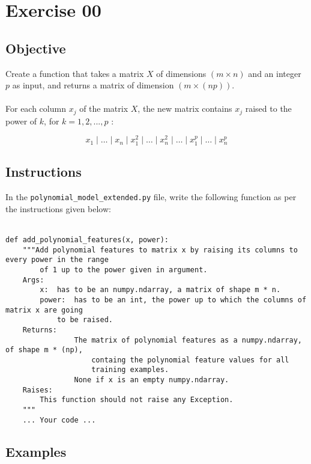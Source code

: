 \chapter{Exercise 00}
%
{}
\makeheaderfilesforbidden

\section*{Objective}
Create a function that takes a matrix $X$ of dimensions $(m \times n)$ and an integer $p$ 
as input, and returns a matrix of dimension $(m \times (np))$.\\
\\
For each column $x_j$ of the matrix $X$, the new matrix contains
$x_j$ raised to the power of $k$, for $k = 1, 2, ..., p$ :

$$
x_1  \mid  \ldots  \mid  x_n  \mid  x_1^2  \mid  \ldots  \mid  x_n^2  \mid  \ldots  \mid  x_1^p  \mid  \ldots  \mid  x_n^p
$$
\newpage
\section*{Instructions}
In the \texttt{polynomial\_model\_extended.py} file, write the following function 
as per the instructions given below:\\
\\
\begin{verbatim}
def add_polynomial_features(x, power):
	"""Add polynomial features to matrix x by raising its columns to every power in the range 
		of 1 up to the power given in argument.  
	Args:
		x: 	has to be an numpy.ndarray, a matrix of shape m * n.
		power: 	has to be an int, the power up to which the columns of matrix x are going
			to be raised.
	Returns:
				The matrix of polynomial features as a numpy.ndarray, of shape m * (np),
					containg the polynomial feature values for all 
					training examples.
				None if x is an empty numpy.ndarray.
	Raises:
		This function should not raise any Exception.
	"""
	... Your code ...
\end{verbatim}


\section*{Examples}

